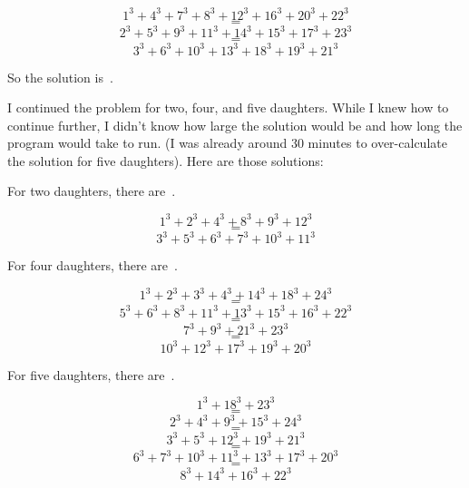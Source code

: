 \documentclass{article}
\begin{document}
\[1^{3}+4^{3}+7^{3}+8^{3}+12^{3}+16^{3}+20^{3}+22^{3}\]
\[=\]
\[2^{3}+5^{3}+9^{3}+11^{3}+14^{3}+15^{3}+17^{3}+23^{3}\]
\[=\]
\[3^{3}+6^{3}+10^{3}+13^{3}+18^{3}+19^{3}+21^{3}\]

So the solution is
\,.

I continued the problem for two, four, and five daughters.
While I knew how to continue further, I didn't know how large the solution would be and how long the program would take to run.
(I was already around 30 minutes to over-calculate the solution for five daughters).
Here are those solutions:

For two daughters, there are
\,.

\[1^{3}+2^{3}+4^{3}+8^{3}+9^{3}+12^{3}\]
\[=\]
\[3^{3}+5^{3}+6^{3}+7^{3}+10^{3}+11^{3}\]

For four daughters, there are
\,.

\[1^{3}+2^{3}+3^{3}+4^{3}+14^{3}+18^{3}+24^{3}\]
\[=\]
\[5^{3}+6^{3}+8^{3}+11^{3}+13^{3}+15^{3}+16^{3}+22^{3}\]
\[=\]
\[7^{3}+9^{3}+21^{3}+23^{3}\]
\[=\]
\[10^{3}+12^{3}+17^{3}+19^{3}+20^{3}\]

\newpage

For five daughters, there are
\,.

\[1^{3}+18^{3}+23^{3}\]
\[=\]
\[2^{3}+4^{3}+9^{3}+15^{3}+24^{3}\]
\[=\]
\[3^{3}+5^{3}+12^{3}+19^{3}+21^{3}\]
\[=\]
\[6^{3}+7^{3}+10^{3}+11^{3}+13^{3}+17^{3}+20^{3}\]
\[=\]
\[8^{3}+14^{3}+16^{3}+22^{3}\]
\end{document}
